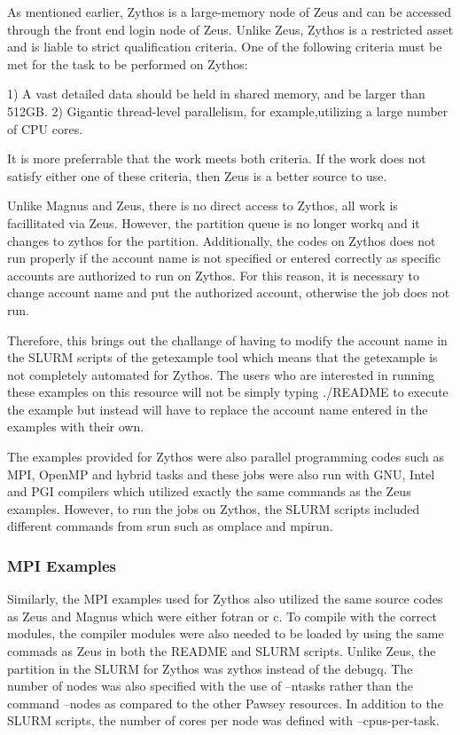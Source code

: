 \documentclass[journal]{IEEEtran}
\begin{document}
{As mentioned earlier, Zythos is a large-memory node of Zeus and can be accessed through the front end login node of Zeus. Unlike Zeus, Zythos is a 
restricted asset and is liable to strict qualification criteria. One of the following criteria must be met for the task to be performed on Zythos:

1) A vast detailed data should be held in shared memory, and be larger than 512GB.
2) Gigantic thread-level parallelism, for example,utilizing a large number of CPU cores.

It is more preferrable that the work meets both criteria. If the work does not satisfy either one of these criteria, then Zeus is a better source to
use.

Unlike Magnus and Zeus, there is no direct access to Zythos, all work is facillitated via Zeus. However, the partition queue is no longer workq and it
changes to zythos for the partition. Additionally, the codes on Zythos does not run properly if the account name is not specified or entered correctly
as specific accounts are authorized to run on Zythos. For this reason, it is necessary to change account name and put the authorized account, otherwise 
the job does not run.

Therefore, this brings out the challange of having to modify the account name in the SLURM scripts of the getexample tool which means that the
getexample is not completely automated for Zythos. The users who are interested in running these examples on this resource will not be simply typing
./README to execute the example but instead will have to replace the account name entered in the examples with their own.

The examples provided for Zythos were also parallel programming codes such as MPI, OpenMP and hybrid tasks and these jobs were also run with GNU, Intel
and PGI compilers which utilized exactly the same commands as the Zeus examples. However, to run the jobs on Zythos, the SLURM scripts included
different commands from srun such as omplace and mpirun. 


\subsubsection{MPI Examples}

Similarly, the MPI examples used for Zythos also utilized the same source codes as Zeus and Magnus which were either fotran or c. To compile with the
correct modules, the compiler modules were also needed to be loaded by using the same commads as Zeus in both the README and SLURM scripts. Unlike Zeus, 
the partition in the SLURM for Zythos was zythos instead of the debugq. The number of nodes was also specified with the use of --ntasks rather than the 
command --nodes as compared to the other Pawsey resources. In addition to the SLURM scripts, the number of cores per node was defined with 
--cpus-per-task.    

}
\end{document}

